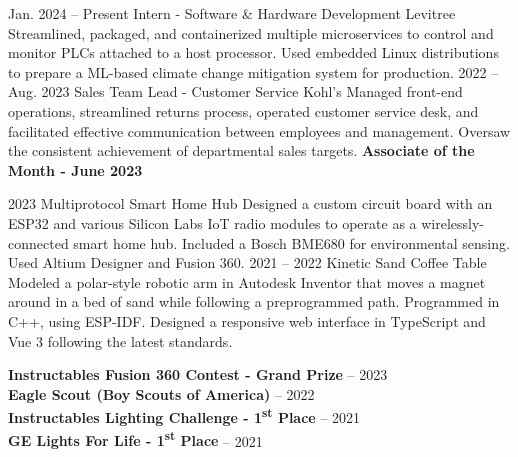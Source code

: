 \documentclass[9pt]{developercv} %
\begin{document}


\begin{entrylist}
	\entry
		{Jan. 2024 -- Present}
		{Intern - Software \& Hardware Development}
		{Levitree}
		{Streamlined, packaged, and containerized multiple microservices to control and monitor PLCs attached to a host processor. Used embedded Linux distributions to prepare a ML-based climate change mitigation system for production. }
	\entry
		{2022 -- Aug. 2023}
		{Sales Team Lead - Customer Service}
		{Kohl's}
		{Managed front-end operations, streamlined returns process, operated customer service desk, and facilitated effective communication between employees and management. Oversaw the consistent achievement of departmental sales targets.  \textbf{Associate of the Month - June 2023} }
\end{entrylist}



\begin{entrylist}
	\entry
		{2023}
		{Multiprotocol Smart Home Hub}
		{}
		{Designed a custom circuit board with an ESP32 and various Silicon Labs IoT radio modules to operate as a wirelessly-connected smart home hub. Included a Bosch BME680 for environmental sensing. Used Altium Designer and Fusion 360.}
		\entry
		{2021 -- 2022}
		{Kinetic Sand Coffee Table}
		{}
		{Modeled a polar-style robotic arm in Autodesk Inventor that moves a magnet around in a bed of sand while following a preprogrammed path. Programmed in C++, using ESP-IDF. Designed a responsive web interface in TypeScript and Vue 3 following the latest standards.}
\end{entrylist}

\vspace{0.3cm}


\begin{minipage}[t]{1\textwidth}
	\vspace{-\baselineskip} %
	
	
	\textbf{Instructables Fusion 360 Contest - Grand Prize} -- 2023\\
	\textbf{Eagle Scout (Boy Scouts of America)} -- 2022\\
	\textbf{Instructables Lighting Challenge - 1\textsuperscript{st} Place} -- 2021\\
	\textbf{GE Lights For Life - 1\textsuperscript{st} Place} -- 2021\\
\end{minipage}

\vspace{\baselineskip}

\end{document}

